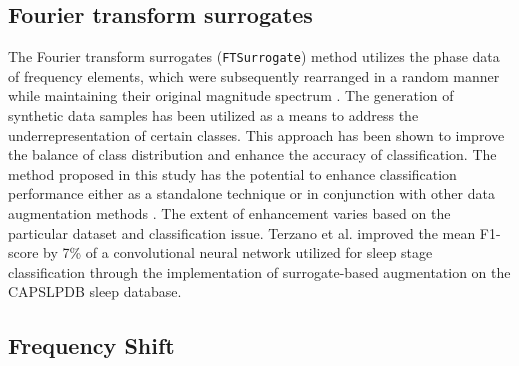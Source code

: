 \documentclass[runningheads]{llncs}
\begin{document}
\subsection{Fourier transform surrogates}
The Fourier transform surrogates (\texttt{FTSurrogate}) method utilizes the phase data of frequency elements, which were subsequently rearranged in a random manner while maintaining their original magnitude spectrum \cite{schwabedal2018addressing}. The generation of synthetic data samples has been utilized as a means to address the underrepresentation of certain classes. This approach has been shown to improve the balance of class distribution and enhance the accuracy of classification. The method proposed in this study has the potential to enhance classification performance either as a standalone technique or in conjunction with other data augmentation methods \cite{schwabedal2018addressing}. The extent of enhancement varies based on the particular dataset and classification issue. Terzano et al. \cite{terzano2001atlas} improved the mean F1-score by 7\% of a convolutional neural network utilized for sleep stage classification through the implementation of surrogate-based augmentation on the CAPSLPDB sleep database.

\subsection{Frequency Shift}
\end{document}
